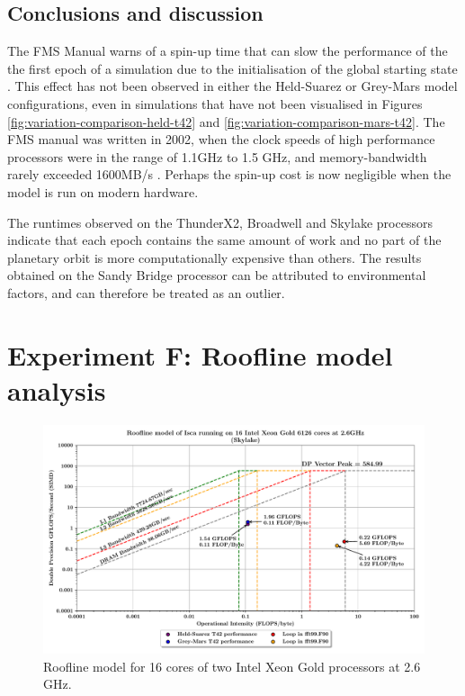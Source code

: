 \documentclass[a4paper,11pt]{report}
\begin{document}
\subsection{Conclusions and discussion}
The FMS Manual warns of a spin-up time that can slow the performance of the the first epoch of a simulation due to the initialisation of the global starting state \cite{balaji2002fms}. This effect has not been observed in either the Held-Suarez or Grey-Mars model configurations, even in simulations that have not been visualised in Figures \ref{fig:variation-comparison-held-t42} and \ref{fig:variation-comparison-mars-t42}. The FMS manual was written in 2002, when the clock speeds of high performance processors were in the range of 1.1GHz to 1.5 GHz, and memory-bandwidth rarely exceeded 1600MB/s \cite{behling2001power4, carvalho2002gap}. Perhaps the spin-up cost is now negligible when the model is run on modern hardware. 
\par
The runtimes observed on the ThunderX2, Broadwell and Skylake processors indicate that each epoch contains the same amount of work and no part of the planetary orbit is more computationally expensive than others. The results obtained on the Sandy Bridge processor can be attributed to environmental factors, and can therefore be treated as an outlier. 


\section{Experiment F: Roofline model analysis}

\begin{figure}[htbp]
\begin{center}
 \includegraphics[width=\textwidth]{img/roofline_model_bluepebble.pdf}
\caption[Roofline model of Isca on Intel hardware]{Roofline model for 16 cores of two Intel Xeon Gold processors at 2.6 GHz. } 
\label{fig:roofline}
\end{center}
\end{figure}
\end{document}
